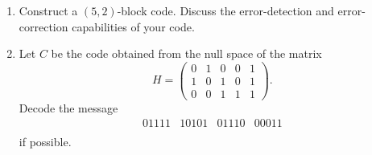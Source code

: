 {\begin{enumerate}
\vspace{3pt}        %
\hspace{-7pt}
\begin{minipage}[t]{4.6in}
\noindent
\begin{minipage}[t]{2.25in}
\begin{itemize}
 
 \item[{\bf (c)}]
 
\end{itemize}
\end{minipage} \hfill
\begin{minipage}[t]{2.25in}
\begin{itemize}
 
 \item[{\bf (d)}]
 
\end{itemize}
\end{minipage}
\end{minipage}
 
\vspace{2pt}        %
 
 
 
\item %
Construct a $(5,2)$-block code. Discuss the error-detection and
error-correction capabilities of your code.
 
 
\item
Let $C$ be the code obtained from the null space of the matrix
\[
H =
\left(
\begin{array}{ccccc}
0 & 1 & 0 & 0 & 1 \\
1 & 0 & 1 & 0 & 1 \\
0 & 0 & 1 & 1 & 1
\end{array}
\right).
\]
Decode the message
\[
\begin{array}{cccc}
01111 & 10101 & 01110 & 00011  \\
\end{array}
\]
if possible.
 

\end{enumerate}}
